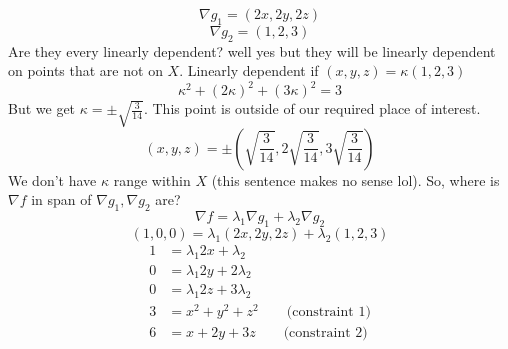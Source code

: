 \documentclass[letter]{article}
\begin{document}
\[
\nabla g_1 = (2x, 2y , 2z)
\]
\[
\nabla g_2 =( 1,2,3)
\] 
Are they every linearly dependent? well yes but they will be linearly dependent on points that are not on $X$. 
Linearly dependent if $(x,y,z) = \kappa (1,2,3)$
\[
\kappa^2 + (2\kappa)^2 + (3\kappa)^2 = 3
\] 
But we get $\kappa = \pm \sqrt{\frac{3}{14}} $. This point is outside of our required place of interest. 
\[
	(x,y,z) = \pm 
\left(
	\sqrt{\frac{3}{14}}  , 2 \sqrt{\frac{3}{14}} , 3 \sqrt{\frac{3}{14}} 
	\right)
\]
We don't have $\kappa$ range within $X$ (this sentence makes no sense lol). So, where is $\nabla f$ in span of $\nabla g_1, \nabla g_2$ are? 
\[
\nabla f = \lambda_1 \nabla g_1 + \lambda_2 \nabla g_2
\]
\[
	(1,0,0) = \lambda_1 (2x, 2y, 2z) + \lambda_2 (1,2,3)
\] 
\begin{align*}
	1 &= \lambda_1 2x + \lambda_2 \\
	0 &= \lambda_1 2y + 2\lambda_2 \\
	0 &= \lambda_1 2z + 3 \lambda_2 \\
	3 &= x^2 + y^2 + z^2 \qquad \text{(constraint 1)}\\
	6 &= x+ 2y + 3z \qquad \text{(constraint 2)} \\
\end{align*}
\end{document}
